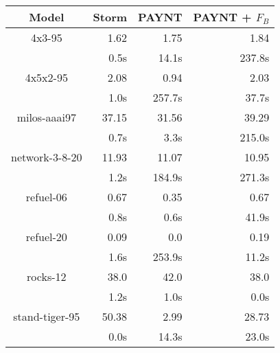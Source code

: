 \begin{table}
\begin{tabular}{|c|r|r|r|}
\hline

Model & Storm & PAYNT & PAYNT + $F_{B}$ \\ \hline 

4x3-95 & 1.62 & 1.75 & 1.84 \\
 & 0.5s & 14.1s & 237.8s \\
\hline
4x5x2-95 & 2.08 & 0.94 & 2.03 \\
 & 1.0s & 257.7s & 37.7s \\
\hline
milos-aaai97 & 37.15 & 31.56 & 39.29 \\
 & 0.7s & 3.3s & 215.0s \\
\hline
network-3-8-20 & 11.93 & 11.07 & 10.95 \\
 & 1.2s & 184.9s & 271.3s \\
\hline
refuel-06 & 0.67 & 0.35 & 0.67 \\
 & 0.8s & 0.6s & 41.9s \\
\hline
refuel-20 & 0.09 & 0.0 & 0.19 \\
 & 1.6s & 253.9s & 11.2s \\
\hline
rocks-12 & 38.0 & 42.0 & 38.0 \\
 & 1.2s & 1.0s & 0.0s \\
\hline
stand-tiger-95 & 50.38 & 2.99 & 28.73 \\
 & 0.0s & 14.3s & 23.0s \\
\hline
\end{tabular}
\end{table}

